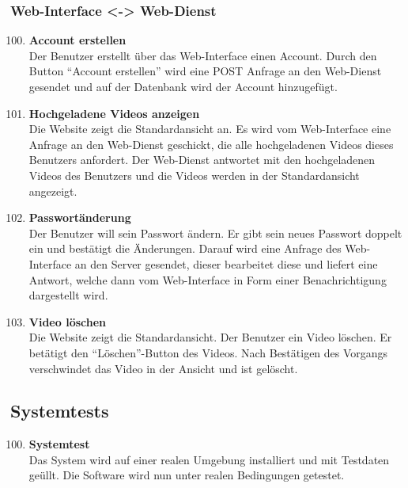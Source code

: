 \subsubsection{\gls{Web-Interface} <-> \gls{Web-Dienst}}
\begin{enumerate}[\bfseries{T}10]  
\setcounter{enumi}{99}{}

\item \textbf{Account erstellen} \hfill\\
Der Benutzer erstellt \"uber das \gls{Web-Interface} einen Account. Durch den Button ``Account erstellen'' wird eine POST Anfrage an den \gls{Web-Dienst} gesendet und auf der Datenbank wird der Account hinzugef\"ugt.

\item \textbf{Hochgeladene Videos anzeigen} \hfill\\
Die Website zeigt die Standardansicht an. Es wird vom \gls{Web-Interface} eine Anfrage an den \gls{Web-Dienst} geschickt, die alle hochgeladenen Videos dieses Benutzers anfordert. Der \gls{Web-Dienst} antwortet mit den hochgeladenen Videos des Benutzers und die Videos werden in der Standardansicht angezeigt. 

\item \textbf{Passwort\"anderung} \hfill\\
Der Benutzer will sein Passwort \"andern. Er gibt sein neues Passwort doppelt ein und best\"atigt die \"Anderungen. Darauf wird eine Anfrage des \gls{Web-Interface} an den Server gesendet, dieser bearbeitet diese und liefert eine Antwort, welche dann vom \gls{Web-Interface} in Form einer Benachrichtigung dargestellt wird.

\item \textbf{Video l\"oschen} \hfill\\
Die Website zeigt die Standardansicht. Der Benutzer ein Video l\"oschen. Er bet\"atigt den ``L\"oschen''-Button des Videos. Nach Best\"atigen des Vorgangs verschwindet das Video in der Ansicht und ist gel\"oscht.

\end{enumerate}

\subsection{Systemtests}
\begin{enumerate}[\bfseries{T}10]  
\setcounter{enumi}{99}{}

\item \textbf{Systemtest} \hfill\\  
Das System wird auf einer realen Umgebung installiert und mit Testdaten ge\"ullt. Die Software wird nun unter realen Bedingungen getestet.
\end{enumerate}
